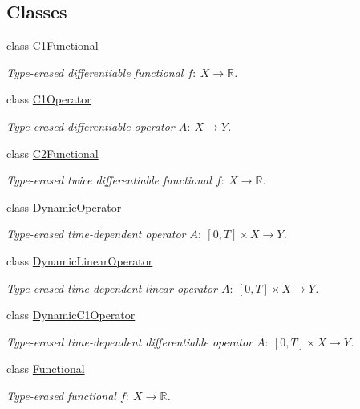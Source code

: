 \subsection*{Classes}
\begin{DoxyCompactItemize}
\item 
class \hyperlink{classSpacy_1_1C1Functional}{C1\-Functional}
\begin{DoxyCompactList}\small\item\em Type-\/erased differentiable functional $f:\ X \to \mathbb{R} $. \end{DoxyCompactList}\item 
class \hyperlink{classSpacy_1_1C1Operator}{C1\-Operator}
\begin{DoxyCompactList}\small\item\em Type-\/erased differentiable operator $A:\ X \to Y $. \end{DoxyCompactList}\item 
class \hyperlink{classSpacy_1_1C2Functional}{C2\-Functional}
\begin{DoxyCompactList}\small\item\em Type-\/erased twice differentiable functional $f:\ X \to \mathbb{R} $. \end{DoxyCompactList}\item 
class \hyperlink{classSpacy_1_1DynamicOperator}{Dynamic\-Operator}
\begin{DoxyCompactList}\small\item\em Type-\/erased time-\/dependent operator $A:\ [0,T] \times X \to Y $. \end{DoxyCompactList}\item 
class \hyperlink{classSpacy_1_1DynamicLinearOperator}{Dynamic\-Linear\-Operator}
\begin{DoxyCompactList}\small\item\em Type-\/erased time-\/dependent linear operator $A:\ [0,T] \times X \to Y $. \end{DoxyCompactList}\item 
class \hyperlink{classSpacy_1_1DynamicC1Operator}{Dynamic\-C1\-Operator}
\begin{DoxyCompactList}\small\item\em Type-\/erased time-\/dependent differentiable operator $A:\ [0,T] \times X \to Y $. \end{DoxyCompactList}\item 
class \hyperlink{classSpacy_1_1Functional}{Functional}
\begin{DoxyCompactList}\small\item\em Type-\/erased functional $f:\ X \to \mathbb{R} $. \end{DoxyCompactList}\item 

\end{DoxyCompactItemize}
